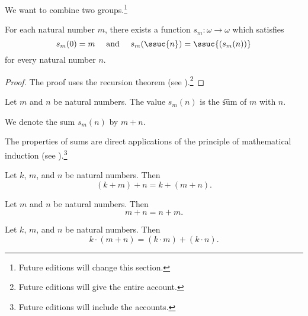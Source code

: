 

We want to combine two groups.\footnote{Future editions will change this section.}


\begin{proposition}
	For each natural number $m$, there exists a function $s_m: \omega \to \omega$ which satisfies
	\[
		s_m(0) = m \quad \text{ and } \quad s_m(\ssuc{n}) = \ssuc{(s_m(n))}
	\]
	for every natural number $n$.
\end{proposition}
\begin{proof}
	The proof uses the recursion theorem (see ).\footnote{Future editions will give the entire account.}
\end{proof}
Let $m$ and $n$ be natural numbers.
The value $s_m(n)$ is the \t{sum} of $m$ with $n$.



We denote the sum $s_m(n)$ by $m + n$.



The properties of sums are direct applications of the principle of mathematical induction (see ).\footnote{Future editions will include the accounts.}

\begin{proposition}[Associative]
	Let $k$, $m$, and $n$ be natural numbers. Then
	\[
		(k + m) + n = k + (m + n).
	\]
\end{proposition}

\begin{proposition}[Commutative]
	Let $m$ and $n$ be natural numbers. Then
	\[
		m + n = n + m.
	\]
\end{proposition}


\begin{proposition}[Distributive]
	Let $k$, $m$, and $n$ be natural numbers. Then
	\[
		k \cdot (m + n) = (k \cdot m) + (k \cdot n).
	\]
\end{proposition}
